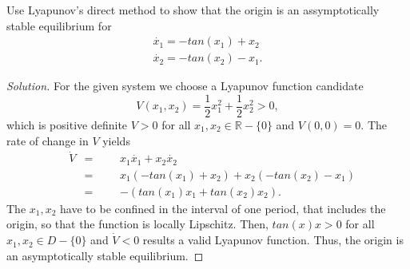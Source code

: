 \documentclass[12pt]{article}
\newenvironment{problem}[2][Problem]{\begin{trivlist}
\item[\hskip \labelsep {\bfseries #1}\hskip \labelsep {\bfseries #2.}]}{\end{trivlist}}
\newenvironment{solution}{\begin{proof}[Solution]}{\end{proof}}
\begin{document}
\begin{problem}{4} %
Use Lyapunov's direct method to show that the origin is an assymptotically stable equilibrium for 
\begin{align*}
\dot{x_1}=-tan(x_1)+x_2\\
\dot{x_2}=-tan(x_2)-x_1.
\end{align*}
\end{problem}
\begin{solution}
For the given system we choose a Lyapunov function candidate
\begin{equation*}
V(x_1,x_2)=\frac{1}{2}x_1^2+\frac{1}{2}x_2^2>0,
\end{equation*}
which is positive definite $V>0$ for all $x_1,x_2 \in \mathbb{R}-\{0 \}$ and $V(0,0)=0$. The rate of change in $V$ yields
\begin{equation*}
\begin{aligned}
& \dot{V}
&  =
&&& x_1\dot{x_1}+x_2\dot{x_2}\\
&& =
&&& x_1(-tan(x_1) +x_2)+x_2(-tan(x_2)-x_1)\\
&& =
&&& -(tan(x_1)x_1+tan(x_2)x_2).
\end{aligned}
\end{equation*}
The $x_1,x_2$ have to be confined in the interval of one period, that includes the origin, so that the function is locally Lipschitz. Then, $tan(x)x>0$ for all $x_1,x_2 \in D-\{0 \}$ and $\dot{V}<0$ results a valid Lyapunov function. Thus, the origin is an asymptotically stable equilibrium.



\end{solution}
\end{document}
